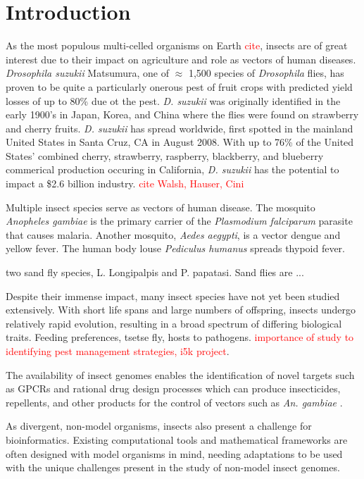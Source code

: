 \chapter{Introduction}
As the most populous multi-celled organisms on Earth \textcolor{red}{cite}, insects are of great interest due to their impact on agriculture and role as vectors of human diseases.  \emph{Drosophila suzukii} Matsumura, one of $\approx$ 1,500 species of \emph{Drosophila} flies, has proven to be quite a particularly onerous pest of fruit crops with predicted yield losses of up to 80\% due ot the pest.  \emph{D. suzukii} was originally identified in the early 1900's in Japan, Korea, and China where the flies were found on strawberry and cherry fruits. \emph{D. suzukii} has spread worldwide, first spotted in the mainland United States in Santa Cruz, CA in August 2008. With up to 76\% of the United States' combined cherry, strawberry, raspberry, blackberry, and blueberry commerical production occuring in California, \emph{D. suzukii} has the potential to impact a \$2.6 billion industry. \textcolor{red}{cite Walsh, Hauser, Cini}  

Multiple insect species serve as vectors of human disease.  The mosquito \emph{Anopheles gambiae} is the primary carrier of the \emph{Plasmodium falciparum} parasite that causes malaria. Another mosquito, \emph{Aedes aegypti}, is a vector dengue and yellow fever. The human body louse \emph{Pediculus humanus} spreads thypoid fever. \cite{Fournier2002, Foucault2006, Grimmelikhuijzen2007}

two sand fly species, L. Longipalpis and P. papatasi. Sand flies are ...

Despite their immense impact, many insect species have not yet been studied extensively.  With short life spans and large numbers of offspring, insects undergo relatively rapid evolution, resulting in a broad spectrum of differing biological traits. Feeding preferences, tsetse fly, hosts to pathogens. \textcolor{red}{importance of study to identifying pest management strategies, i5k project}.

The availability of insect genomes enables the identification of novel targets such as GPCRs and rational drug design processes which can produce insecticides, repellents, and other products for the control of vectors such as \emph{An. gambiae} \cite{Grimmelikhuijzen2007, Justice2003}.

As divergent, non-model organisms, insects also present a challenge for bioinformatics. Existing computational tools and mathematical frameworks are often designed with model organisms in mind, needing adaptations to be used with the unique challenges present in the study of non-model insect genomes.

